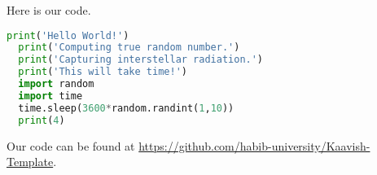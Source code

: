 Here is our code.

\begin{lstlisting}[language=python, showstringspaces=false,frame=single]
  print('Hello World!')
  print('Computing true random number.')
  print('Capturing interstellar radiation.')
  print('This will take time!')
  import random
  import time
  time.sleep(3600*random.randint(1,10))
  print(4)
\end{lstlisting}

Our code can be found at \url{https://github.com/habib-university/Kaavish-Template}.

